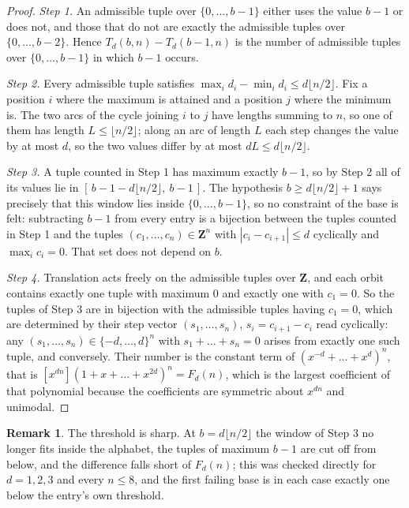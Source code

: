 \documentclass[11pt,a4paper]{article}
\theoremstyle{plain}
\theoremstyle{definition}
\newtheorem{remark}[theorem]{Remark}
\begin{document}
\begin{proof}
\emph{Step 1.} An admissible tuple over $\{0,\dots,b-1\}$ either uses the value $b-1$ or does
not, and those that do not are exactly the admissible tuples over $\{0,\dots,b-2\}$. Hence
$T_d(b,n)-T_d(b-1,n)$ is the number of admissible tuples over $\{0,\dots,b-1\}$ in which
$b-1$ occurs.

\emph{Step 2.} Every admissible tuple satisfies $\max_i d_i-\min_i d_i\le d\lfloor n/2\rfloor$.
Fix a position $i$ where the maximum is attained and a position $j$ where the minimum is. The
two arcs of the cycle joining $i$ to $j$ have lengths summing to $n$, so one of them has length
$L\le\lfloor n/2\rfloor$; along an arc of length $L$ each step changes the value by at most $d$,
so the two values differ by at most $dL\le d\lfloor n/2\rfloor$.

\emph{Step 3.} A tuple counted in Step 1 has maximum exactly $b-1$, so by Step 2 all of its
values lie in $[\,b-1-d\lfloor n/2\rfloor,\ b-1\,]$. The hypothesis $b\ge d\lfloor n/2\rfloor+1$
says precisely that this window lies inside $\{0,\dots,b-1\}$, so no constraint of the base is
felt: subtracting $b-1$ from every entry is a bijection between the tuples counted in Step 1 and
the tuples $(c_1,\dots,c_n)\in\mathbf{Z}^{n}$ with $|c_i-c_{i+1}|\le d$ cyclically and
$\max_i c_i=0$. That set does not depend on $b$.

\emph{Step 4.} Translation acts freely on the admissible tuples over $\mathbf{Z}$, and each
orbit contains exactly one tuple with maximum $0$ and exactly one with $c_1=0$. So the tuples of
Step 3 are in bijection with the admissible tuples having $c_1=0$, which are determined by their
step vector $(s_1,\dots,s_n)$, $s_i=c_{i+1}-c_i$ read cyclically: any
$(s_1,\dots,s_n)\in\{-d,\dots,d\}^{n}$ with $s_1+\dots+s_n=0$ arises from exactly one such
tuple, and conversely. Their number is the constant term of
$(x^{-d}+\dots+x^{d})^{n}$, that is $[x^{dn}](1+x+\dots+x^{2d})^{n}=F_d(n)$, which is
the largest coefficient of that polynomial because the coefficients are symmetric about $x^{dn}$
and unimodal.
\end{proof}

\begin{remark}
The threshold is sharp. At $b=d\lfloor n/2\rfloor$ the window of Step 3 no longer fits inside
the alphabet, the tuples of maximum $b-1$ are cut off from below, and the difference falls short
of $F_d(n)$; this was checked directly for $d=1,2,3$ and every $n\le8$, and the first failing
base is in each case exactly one below the entry's own threshold.
\end{remark}
\end{document}
